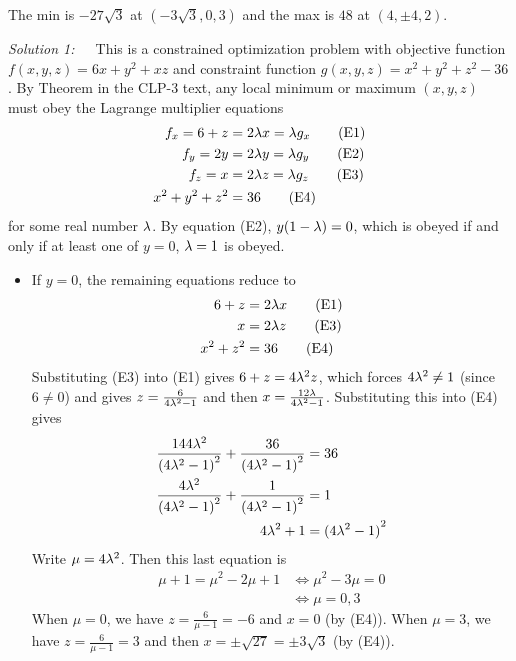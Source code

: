 \begin{answer}
The min is $-27\sqrt{3}$ at $(-3\sqrt{3},0,3)$
and the max is $48$ at $(4,\pm 4,2)$.
\end{answer}

\begin{solution}
\emph{Solution 1:}\ \ \ 
This is a constrained optimization problem with objective function
$f(x,y,z) = 6 x +y^2 +xz$ and constraint function $g(x,y,z) =x^2+y^2+z^2-36$.
By Theorem \eref{CLP200}{thm Lagrange} in the CLP-3 text, any local minimum
or maximum $(x,y,z)$ must obey the  Lagrange multiplier equations
\begin{align*}
f_x = 6+z &=2 \lambda x = \lambda g_x \tag{E1} \\ 
f_y = 2y &=2 \lambda y = \lambda g_y \tag{E2} \\ 
f_z = x &=2 \lambda z = \lambda g_z \tag{E3} \\ 
x^2 + y^2 + z^2 &= 36 \tag{E4}
\end{align*}
for some real number $\lambda$. By equation (E2), $y(1-\lambda)=0$, which is
obeyed if and only if at least one of $y=0$, $\lambda=1$ is obeyed.
\begin{itemize}
\item 
If $y=0$, the remaining equations reduce to
\begin{align*}
6+z &=2 \lambda x  \tag{E1} \\ 
x &=2 \lambda z \tag{E3} \\ 
x^2  + z^2 &= 36 \tag{E4}
\end{align*}
Substituting (E3) into (E1) gives $6 + z = 4\lambda^ 2 z$, 
which forces $4\lambda^2\ne 1$ (since $6\ne 0$)
and gives $z = \frac{6}{4\lambda^2-1}$ and then 
$x=\frac{12\lambda}{4\lambda^2-1}$. Substituting this into (E4) gives
\begin{align*}
\frac{144\lambda^2}{{(4\lambda^2-1)}^2} +\frac{36}{{(4\lambda^2-1)}^2}&=36 \\
\frac{4\lambda^2}{{(4\lambda^2-1)}^2} +\frac{1}{{(4\lambda^2-1)}^2}&=1 \\
4\lambda^2+1 &= {(4\lambda^2-1)}^2 
\end{align*}
Write $\mu=4\lambda^2$. Then this last equation is
\begin{align*}
\mu+1 = \mu^2 -2\mu +1
&\iff \mu^2-3\mu =0 \\
&\iff \mu=0,3
\end{align*}
When $\mu=0$, we have $z=\frac{6}{\mu-1}=-6$ and $x=0$ (by (E4)).
When $\mu=3$, we have $z=\frac{6}{\mu-1}=3$ and then $x=\pm \sqrt{27}
=\pm 3\sqrt{3}$ (by (E4)).


\end{itemize}
\end{solution}
